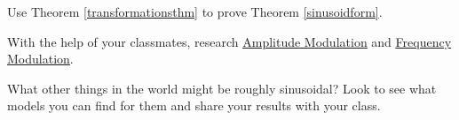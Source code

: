 \documentclass{ximera}
\begin{document}
\begin{problem}  \label{proofsinusoidformexercise} 
Use Theorem \ref{transformationsthm} to prove Theorem \ref{sinusoidform}.
\end{problem}


\begin{problem}
With the help of your classmates, research \href{http://en.wikipedia.org/wiki/Amplitude_modulation}{\underline{Amplitude Modulation}} and \href{http://en.wikipedia.org/wiki/Frequency_modulation}{\underline{Frequency Modulation}}.
\end{problem}

\begin{problem} 
What other things in the world might be roughly sinusoidal?  Look to see what models you can find for them and share your results with your class.
\end{problem}
\end{document}
